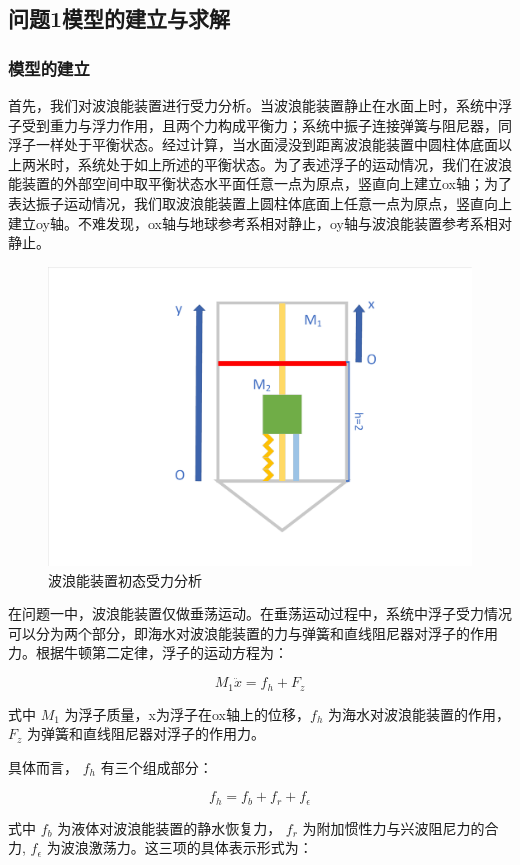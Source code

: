 \documentclass[12pt,utf8]{article}
\begin{document}
\subsection{问题1模型的建立与求解}
\subsubsection{模型的建立}
首先，我们对波浪能装置进行受力分析。当波浪能装置静止在水面上时，系统中浮子受到重力与浮力作用，且两个力构成平衡力；系统中振子连接弹簧与阻尼器，同浮子一样处于平衡状态。经过计算，当水面浸没到距离波浪能装置中圆柱体底面以上两米时，系统处于如上所述的平衡状态。为了表述浮子的运动情况，我们在波浪能装置的外部空间中取平衡状态水平面任意一点为原点，竖直向上建立ox轴；为了表达振子运动情况，我们取波浪能装置上圆柱体底面上任意一点为原点，竖直向上建立oy轴。不难发现，ox轴与地球参考系相对静止，oy轴与波浪能装置参考系相对静止。

\begin{figure}[h]
	\centering
	\includegraphics[width=0.4\linewidth]{figures/初态受力分析}
	\caption{波浪能装置初态受力分析}
	\label{图2}
\end{figure}


在问题一中，波浪能装置仅做垂荡运动。在垂荡运动过程中，系统中浮子受力情况可以分为两个部分，即海水对波浪能装置的力与弹簧和直线阻尼器对浮子的作用力。根据牛顿第二定律，浮子的运动方程为：

\begin{equation}
	M_{1} \ddot{x} = f_{h} + F_{z}
\end{equation}

式中 $M_1$ 为浮子质量，x为浮子在ox轴上的位移，$f_h$ 为海水对波浪能装置的作用， $F_z$ 为弹簧和直线阻尼器对浮子的作用力。

具体而言， $f_h$ 有三个组成部分：

\begin{equation}
	f_h = f_b + f_r + f_\epsilon
\end{equation}

式中 $f_b$ 为液体对波浪能装置的静水恢复力， $f_r$ 为附加惯性力与兴波阻尼力的合力, $f_\epsilon$ 为波浪激荡力。这三项的具体表示形式为：
\end{document}
